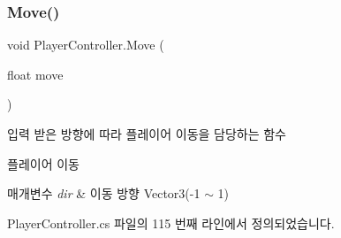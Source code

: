 \subsubsection{\texorpdfstring{Move()}{Move()}}
{\footnotesize\ttfamily void Player\+Controller.\+Move (\begin{DoxyParamCaption}\item[{float}]{move }\end{DoxyParamCaption})}



입력 받은 방향에 따라 플레이어 이동을 담당하는 함수 

플레이어 이동 
\begin{DoxyParams}{매개변수}
{\em dir} & 이동 방향 Vector3(-\/1 $\sim$ 1) \\
\hline
\end{DoxyParams}


Player\+Controller.\+cs 파일의 115 번째 라인에서 정의되었습니다.



